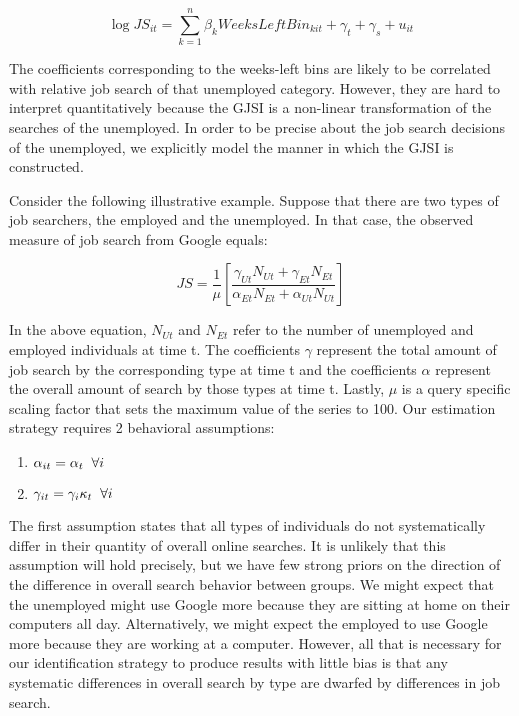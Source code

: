 \documentclass[12pt]{article}
\begin{document}
\begin{spacing}{2}
\begin{appendix}
\begin{spacing}{2}
\begin{equation}
	\log{JS}_{it} = \sum_{k = 1}^{n} \beta_{k} WeeksLeftBin_{kit} + \gamma_{t} + \gamma_{s} + u_{it}
\end{equation}

The coefficients corresponding to the weeks-left bins are likely to be correlated with relative job search of that unemployed category. However, they are hard to interpret quantitatively because the GJSI is a non-linear transformation of the searches of the unemployed. In order to be precise about the job search decisions of the unemployed, we explicitly model the manner in which the GJSI is constructed.

Consider the following illustrative example. Suppose that there are two types of job searchers, the employed and the unemployed. In that case, the observed measure of job search from Google equals:

\begin{equation}\label{eqn:nlls}
JS =\frac{1}{\mu}\left[\frac{\gamma_{Ut} N_{Ut} + \gamma_{Et}N_{Et}}{\alpha_{Et} N_{Et} + \alpha_{Ut} N_{Ut}}\right]
\end{equation}

In the above equation, $N_{Ut}$ and $N_{Et}$ refer to the number of unemployed and employed individuals at time t. The coefficients $\gamma$ represent the total amount of job search by the corresponding type at time t and the coefficients $\alpha$ represent the overall amount of search by those types at time t. Lastly, $\mu$ is a query specific scaling factor that sets the maximum value of the series to 100. Our estimation strategy requires 2 behavioral assumptions:

\begin{enumerate}
\item $\alpha_{it}=\alpha_{t} \hspace{2mm} \forall i$
\item $\gamma_{it}=\gamma_{i}\kappa_{t} \hspace{2mm} \forall i$
\end{enumerate}

The first assumption states that all types of individuals do not systematically differ in their quantity of overall online searches. It is unlikely that this assumption will hold precisely, but we have few strong priors on the direction of the difference in overall search behavior between groups. We might expect that the unemployed might use Google more because they are sitting at home on their computers all day. Alternatively, we might expect the employed to use Google more because they are working at a computer. However, all that is necessary for our identification strategy to produce results with little bias is that any systematic differences in overall search by type are dwarfed by differences in job search.


\end{spacing}
\end{appendix}
\end{spacing}
\end{document}
